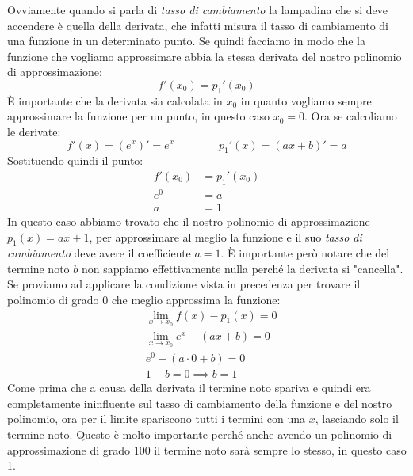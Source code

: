 Ovviamente quando si parla di \textit{tasso di cambiamento} la lampadina che 
si deve accendere è quella della derivata, che infatti misura il tasso di 
cambiamento di una funzione in un determinato punto. Se quindi facciamo in 
modo che la funzione che vogliamo approssimare abbia la stessa derivata del 
nostro polinomio di approssimazione:
\begin{equation*}
	f'(x_0) = p_1'(x_0)
\end{equation*}
È importante che la derivata sia calcolata in $x_0$ in quanto vogliamo sempre 
approssimare la funzione per un punto, in questo caso $x_0 = 0$. Ora se 
calcoliamo le derivate:
\begin{equation*}
	f'(x) = (e^x)' = e^x \qquad \qquad p_1'(x) = (ax + b)' = a
\end{equation*}
Sostituendo quindi il punto:
\begin{align*}
	f'(x_0) &= p_1'(x_0)\\
	e^{0} & = a\\
	a & = 1
\end{align*}
In questo caso abbiamo trovato che il nostro polinomio di approssimazione 
$p_1(x) = ax + 1$, per approssimare al meglio la funzione e il suo 
\textit{tasso di cambiamento} deve avere il coefficiente $a = 1$. È importante 
però notare che del termine noto $b$ non sappiamo effettivamente nulla perché 
la derivata si "cancella". Se proviamo ad applicare la condizione vista in 
precedenza per trovare il polinomio di grado 0 che meglio approssima la 
funzione:
\begin{align*}
	&\lim_{x \to x_0} f(x) - p_1(x) = 0\\
	&\lim_{x \to x_0} e^x - (ax + b) = 0\\
	&e^0 - (a \cdot 0 + b) = 0\\
	&1 - b = 0 \implies b = 1
\end{align*}
Come prima che a causa della derivata il termine noto spariva e quindi era 
completamente ininfluente sul tasso di cambiamento della funzione e del nostro 
polinomio, ora per il limite spariscono tutti i termini con una $x$, lasciando 
solo il termine noto. Questo è molto importante perché anche avendo un 
polinomio di approssimazione di grado 100 il termine noto sarà sempre lo 
stesso, in questo caso 1.

